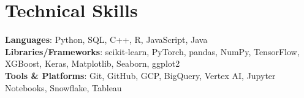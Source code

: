 \documentclass[letterpaper,11pt]{article}
\begin{document}
\section{Technical Skills}
 \begin{itemize}[leftmargin=0in, label={}]
    \small{\item{
     \textbf{Languages}{: Python, SQL, C++, R, JavaScript, Java} \\
     \textbf{Libraries/Frameworks}{: scikit-learn, PyTorch, pandas, NumPy, TensorFlow, XGBoost, Keras, Matplotlib, Seaborn, ggplot2} \\
     \textbf{Tools \& Platforms}{: Git, GitHub, GCP, BigQuery, Vertex AI, Jupyter Notebooks, Snowflake, Tableau}
    }}
 \end{itemize}
\end{document}
